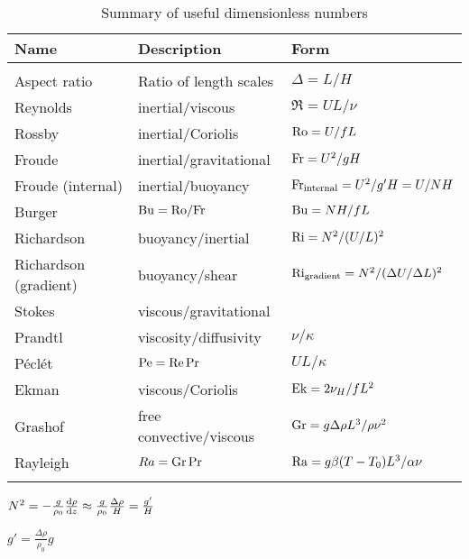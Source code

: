 \begin{table}[t]
\begin{center}
\begin{tabular}{lll} \hline
Name        &   Description         &   Form        \\  \hline
            &                           &               \\
Aspect ratio   &   Ratio of length scales   &   $\Delta=L/H$  \\
Reynolds    &   inertial/viscous        &   $\Re=UL/\nu$    \\
Rossby      &   inertial/Coriolis\footnotemark[6]            &   $\Ro=U/fL$      \\
Froude      &   inertial/gravitational\footnotemark[7] &   $\Fr=U^2/gH$    \\
Froude (internal)   &   inertial/buoyancy   &   $\Fr_{\mathrm{internal}}=U^2/g'H=U/NH$   \\
Burger      &  $\Bu=\Ro/\Fr$    &   $\Bu = NH/fL$  \\
Richardson  &   buoyancy/inertial\footnotemark[8]       &   $\Ri=N^2/(U/L)^2$   \\
Richardson (gradient)   &   buoyancy/shear  &   $\Ri_{\mathrm{gradient}}=N^2/(\Delta U/\Delta L)^2$ \\
Stokes      &   viscous/gravitational   &   \\
Prandtl     &   viscosity/diffusivity   &  $\nu/\kappa$ \\
P\'ecl\'et  &     $\Pe=\Re\,\Pr$  &  $UL/\kappa$ \\
Ekman       &   viscous/Coriolis    &   $\Ek=2\nu_H/fL^2$   \\
Grashof     &    free convective/viscous    & $\Gr=g\Delta\rho L^3/\rho \nu^2$\\
Rayleigh    &     $Ra=\Gr\,\Pr$                 & $\Ra = g\beta(T-T_0)L^3/\alpha\nu$\\
            &                           &               \\  \hline
\end{tabular}
\end{center}

\caption{Summary of useful dimensionless numbers}
\label{tab:dimensionless}
\end{table}

$N^2=-\frac{g}{\rho_0}\ddt[z]{\rho} \approx \frac{g}{\rho_0}\frac{\Delta\rho}{H}=\frac{g'}{H}$

$g' =\frac{\Delta\rho}{\rho_0}g$
